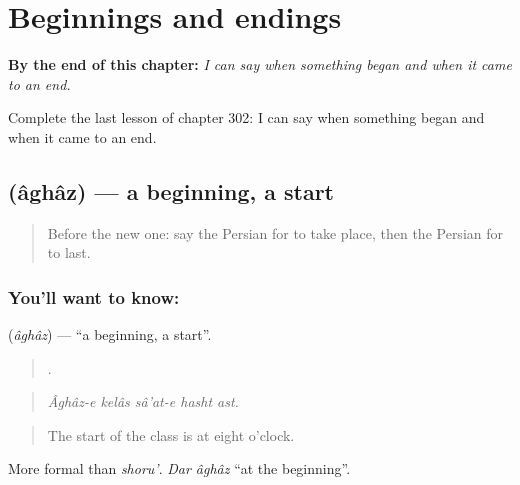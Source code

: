 
\chapter{Beginnings and endings}
\label{ch:fa-beginnings-and-endings}

\begin{chapteropening}
\textbf{By the end of this chapter:} \emph{I can say when something began and when it came to an end.}

Complete the last lesson of chapter 302: I can say when something began and when it came to an end.
\end{chapteropening}

\section[\texorpdfstring{\fa{آغاز} (âghâz)}{آغاز (âghâz)}]{ (âghâz) — a beginning, a start}

\label{lesson:FA-C302-aghaz}



\begin{quote}
Before the new one: say the Persian for to take place, then the Persian for to last.
\end{quote}

\subsection*{You'll want to know: }
\textbf{} (\emph{âghâz}) — \textquotedblleft{}a beginning, a start\textquotedblright{}.

\begin{quote}
    .
\end{quote}

\begin{quote}
\emph{Âghâz-e kelâs sâ'at-e hasht ast.}
\end{quote}

\begin{quote}
The start of the class is at eight o'clock.
\end{quote}

More formal than \emph{shoru'}. \emph{Dar âghâz} \textquotedblleft{}at the beginning\textquotedblright{}.

